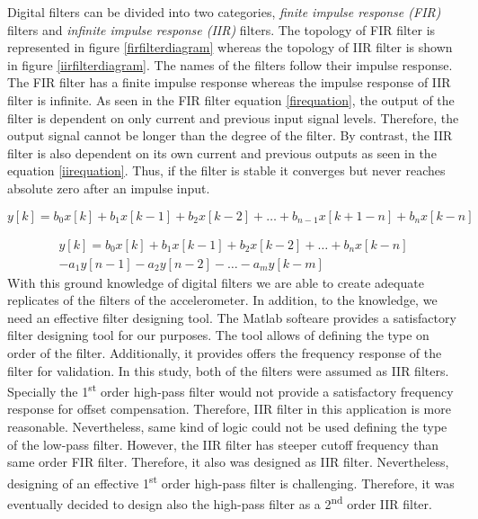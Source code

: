 \documentclass[english,12pt,a4paper,pdftex,elec,utf8]{aaltothesis}
\begin{document}
Digital filters can be divided into two categories, \textit{finite impulse response (FIR)} filters and \textit{infinite impulse response (IIR)} filters. The topology of FIR filter is represented in figure \ref{firfilterdiagram} whereas the topology of IIR filter is shown in figure \ref{iirfilterdiagram}. The names of the filters follow their impulse response. The FIR filter has a finite impulse response whereas the impulse response of IIR filter is infinite. As seen in the FIR filter equation \ref{firequation}, the output of the filter is dependent on only current and previous input signal levels. Therefore, the output signal cannot be longer than the degree of the filter. By contrast, the IIR filter is also dependent on its own current and previous outputs as seen in the equation \ref{iirequation}. Thus, if the filter is stable it converges but never reaches absolute zero after an impulse input.




\begin{equation} \label{firequation}
y[k] = b_0 x[k] + b_1 x[k-1] + b_2 x[k-2] + \dots + b_{n-1} x[k+1-n] + b_n x[k-n]
\end{equation}



\begin{equation} \label{iirequation}
\begin{aligned}
y[k] = b_0 x[k] + b_1 x[k-1] + b_2 x[k-2] + \dots + b_n x[k-n] \\
-a_1 y[n-1] - a_2 y[n-2] - \dots - a_m y[k-m]
\end{aligned}
\end{equation}
With this ground knowledge of digital filters we are able to create adequate replicates of the filters of the accelerometer. In addition, to the knowledge, we need an effective filter designing tool. The Matlab softeare provides a satisfactory filter designing tool \cite{matlabfilterdesigner} for our purposes. The tool allows of defining the type on order of the filter. Additionally, it provides offers the frequency response of the filter for validation. In this study, both of the filters were assumed as IIR filters. Specially the 1\textsuperscript{st} order high-pass filter would not provide a satisfactory frequency response for offset compensation. Therefore, IIR filter in this application is more reasonable. Nevertheless, same kind of logic could not be used defining the type of the low-pass filter. However, the IIR filter has steeper cutoff frequency than same order FIR filter. Therefore, it also was designed as IIR filter. Nevertheless, designing of an effective 1\textsuperscript{st} order high-pass filter is challenging. Therefore, it was eventually decided to design also the high-pass filter as a 2\textsuperscript{nd} order IIR filter.
\end{document}
